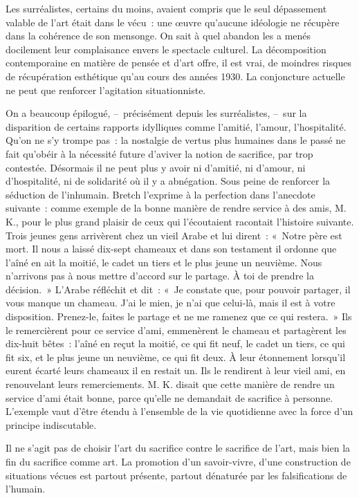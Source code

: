 \documentclass[french,twoside]{book} %
\begin{document}
\noindent Les surréalistes, certains du moins, avaient compris que le seul dépassement valable de l’art était dans le vécu : une œuvre qu’aucune idéologie ne récupère dans la cohérence de son mensonge. On sait à quel abandon les a menés docilement leur complaisance envers le spectacle culturel. La décomposition contemporaine en matière de pensée et d’art offre, il est vrai, de moindres risques de récupération esthétique qu’au cours des années 1930. La conjoncture actuelle ne peut que renforcer l’agitation situationniste.\par
On a beaucoup épilogué, – précisément depuis les surréalistes, – sur la disparition de certains rapports idylliques comme l’amitié, l’amour, l’hospitalité. Qu’on ne s’y trompe pas : la nostalgie de vertus plus humaines dans le passé ne fait qu’obéir à la nécessité future d’aviver la notion de sacrifice, par trop contestée. Désormais il ne peut plus y avoir ni d’amitié, ni d’amour, ni d’hospitalité, ni de solidarité où il y a abnégation. Sous peine de renforcer la séduction de l’inhumain. Bretch l’exprime à la perfection dans l’anecdote suivante : comme exemple de la bonne manière de rendre service à des amis, M. K., pour le plus grand plaisir de ceux qui l’écoutaient racontait l’histoire suivante. Trois jeunes gens arrivèrent chez un vieil Arabe et lui dirent : « Notre père est mort. Il nous a laissé dix-sept chameaux et dans son testament il ordonne que l’aîné en ait la moitié, le cadet un tiers et le plus jeune un neuvième. Nous n’arrivons pas à nous mettre d’accord sur le partage. À toi de prendre la décision. » L’Arabe réfléchit et dit : « Je constate que, pour pouvoir partager, il vous manque un chameau. J’ai le mien, je n’ai que celui-là, mais il est à votre disposition. Prenez-le, faites le partage et ne me ramenez que ce qui restera. » Ils le remercièrent pour ce service d’ami, emmenèrent le chameau et partagèrent les dix-huit bêtes : l’aîné en reçut la moitié, ce qui fit neuf, le cadet un tiers, ce qui fit six, et le plus jeune un neuvième, ce qui fit deux. À leur étonnement lorsqu’il eurent écarté leurs chameaux il en restait un. Ils le rendirent à leur vieil ami, en renouvelant leurs remerciements. M. K. disait que cette manière de rendre un service d’ami était bonne, parce qu’elle ne demandait de sacrifice à personne. L’exemple vaut d’être étendu à l’ensemble de la vie quotidienne avec la force d’un principe indiscutable.\par
Il ne s’agit pas de choisir l’art du sacrifice contre le sacrifice de l’art, mais bien la fin du sacrifice comme art. La promotion d’un savoir-vivre, d’une construction de situations vécues est partout présente, partout dénaturée par les falsifications de l’humain.\par
\end{document}
